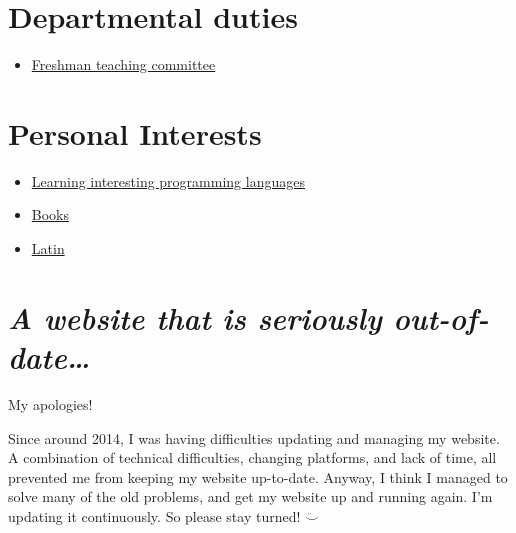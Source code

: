 \documentclass[11pt]{article}
\begin{document}
\section{Departmental duties}
\label{sec:orgf2ce4c4}
\begin{itemize}
\item \href{./tc.html}{Freshman teaching committee}
\end{itemize}
\section{Personal Interests}
\label{sec:org98260d9}
\begin{itemize}
\item \href{./proglang/proglang.html}{Learning interesting programming languages}
\item \href{./personal/books.html}{Books}
\item \href{./personal/latin.html}{Latin}
\end{itemize}

\section{\emph{A website that is seriously out-of-date\ldots{}}}
\label{sec:org604b545}

My apologies!

Since around 2014, I was having difficulties updating and managing my website. A combination of technical difficulties, changing platforms, and lack of time, all prevented me from keeping my website up-to-date. Anyway, I think I managed to solve many of the old problems, and get my website up and running again. I'm updating it continuously. So please stay turned! \(\ddot\smile\)
\end{document}
